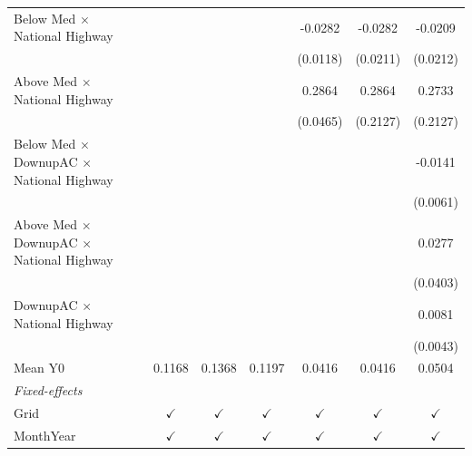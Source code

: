 \begin{table}[htbp]
\begin{tabular}{lcccccc}
      Below Med $\times$ National Highway                     &               &               &               & -0.0282       & -0.0282       & -0.0209\\   
                                                              &               &               &               & (0.0118)      & (0.0211)      & (0.0212)\\   
      Above Med $\times$ National Highway                     &               &               &               & 0.2864        & 0.2864        & 0.2733\\   
                                                              &               &               &               & (0.0465)      & (0.2127)      & (0.2127)\\   
      Below Med $\times$ DownupAC $\times$ National Highway   &               &               &               &               &               & -0.0141\\   
                                                              &               &               &               &               &               & (0.0061)\\   
      Above Med $\times$ DownupAC $\times$ National Highway   &               &               &               &               &               & 0.0277\\   
                                                              &               &               &               &               &               & (0.0403)\\   
      DownupAC $\times$ National Highway                      &               &               &               &               &               & 0.0081\\   
                                                              &               &               &               &               &               & (0.0043)\\   
      \hline Mean Y0                                          & 0.1168        & 0.1368        & 0.1197        & 0.0416        & 0.0416        & 0.0504\\  
      \midrule
      \emph{Fixed-effects}\\
      Grid                                                    & $\checkmark$  & $\checkmark$  & $\checkmark$  & $\checkmark$  & $\checkmark$  & $\checkmark$\\   
      MonthYear                                               & $\checkmark$  & $\checkmark$  & $\checkmark$  & $\checkmark$  & $\checkmark$  & $\checkmark$\\   

\end{tabular}
\end{table}
